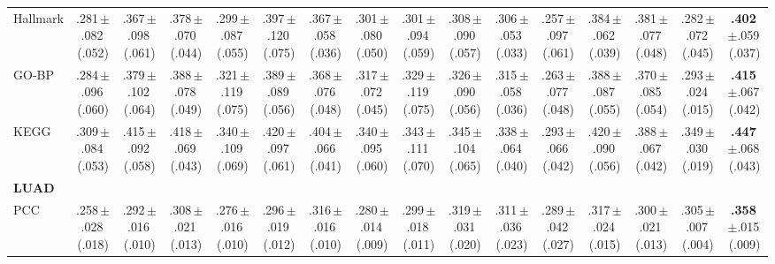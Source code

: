 \begin{table}
\begin{tabular}{lccccccccccccccc}
\quad Hallmark & .281\,{\tiny$\pm$.082}\,{\tiny(.052)} & .367\,{\tiny$\pm$.098}\,{\tiny(.061)} & .378\,{\tiny$\pm$.070}\,{\tiny(.044)} & .299\,{\tiny$\pm$.087}\,{\tiny(.055)} & .397\,{\tiny$\pm$.120}\,{\tiny(.075)} & .367\,{\tiny$\pm$.058}\,{\tiny(.036)} & .301\,{\tiny$\pm$.080}\,{\tiny(.050)} & .301\,{\tiny$\pm$.094}\,{\tiny(.059)} & .308\,{\tiny$\pm$.090}\,{\tiny(.057)} & .306\,{\tiny$\pm$.053}\,{\tiny(.033)} & .257\,{\tiny$\pm$.097}\,{\tiny(.061)} & .384\,{\tiny$\pm$.062}\,{\tiny(.039)} & .381\,{\tiny$\pm$.077}\,{\tiny(.048)} & .282\,{\tiny$\pm$.072}\,{\tiny(.045)} & \textbf{.402}\,{\tiny$\pm$.059}\,{\tiny(.037)}\\
\quad GO-BP & .284\,{\tiny$\pm$.096}\,{\tiny(.060)} & .379\,{\tiny$\pm$.102}\,{\tiny(.064)} & .388\,{\tiny$\pm$.078}\,{\tiny(.049)} & .321\,{\tiny$\pm$.119}\,{\tiny(.075)} & .389\,{\tiny$\pm$.089}\,{\tiny(.056)} & .368\,{\tiny$\pm$.076}\,{\tiny(.048)} & .317\,{\tiny$\pm$.072}\,{\tiny(.045)} & .329\,{\tiny$\pm$.119}\,{\tiny(.075)} & .326\,{\tiny$\pm$.090}\,{\tiny(.056)} & .315\,{\tiny$\pm$.058}\,{\tiny(.036)} & .263\,{\tiny$\pm$.077}\,{\tiny(.048)} & .388\,{\tiny$\pm$.087}\,{\tiny(.055)} & .370\,{\tiny$\pm$.085}\,{\tiny(.054)} & .293\,{\tiny$\pm$.024}\,{\tiny(.015)} & \textbf{.415}\,{\tiny$\pm$.067}\,{\tiny(.042)}\\
\quad KEGG & .309\,{\tiny$\pm$.084}\,{\tiny(.053)} & .415\,{\tiny$\pm$.092}\,{\tiny(.058)} & .418\,{\tiny$\pm$.069}\,{\tiny(.043)} & .340\,{\tiny$\pm$.109}\,{\tiny(.069)} & .420\,{\tiny$\pm$.097}\,{\tiny(.061)} & .404\,{\tiny$\pm$.066}\,{\tiny(.041)} & .340\,{\tiny$\pm$.095}\,{\tiny(.060)} & .343\,{\tiny$\pm$.111}\,{\tiny(.070)} & .345\,{\tiny$\pm$.104}\,{\tiny(.065)} & .338\,{\tiny$\pm$.064}\,{\tiny(.040)} & .293\,{\tiny$\pm$.066}\,{\tiny(.042)} & .420\,{\tiny$\pm$.090}\,{\tiny(.056)} & .388\,{\tiny$\pm$.067}\,{\tiny(.042)} & .349\,{\tiny$\pm$.030}\,{\tiny(.019)} & \textbf{.447}\,{\tiny$\pm$.068}\,{\tiny(.043)}\\
\midrule
\multicolumn{16}{l}{\textbf{LUAD}}\\
\quad PCC & .258\,{\tiny$\pm$.028}\,{\tiny(.018)} & .292\,{\tiny$\pm$.016}\,{\tiny(.010)} & .308\,{\tiny$\pm$.021}\,{\tiny(.013)} & .276\,{\tiny$\pm$.016}\,{\tiny(.010)} & .296\,{\tiny$\pm$.019}\,{\tiny(.012)} & .316\,{\tiny$\pm$.016}\,{\tiny(.010)} & .280\,{\tiny$\pm$.014}\,{\tiny(.009)} & .299\,{\tiny$\pm$.018}\,{\tiny(.011)} & .319\,{\tiny$\pm$.031}\,{\tiny(.020)} & .311\,{\tiny$\pm$.036}\,{\tiny(.023)} & .289\,{\tiny$\pm$.042}\,{\tiny(.027)} & .317\,{\tiny$\pm$.024}\,{\tiny(.015)} & .300\,{\tiny$\pm$.021}\,{\tiny(.013)} & .305\,{\tiny$\pm$.007}\,{\tiny(.004)} & \textbf{.358}\,{\tiny$\pm$.015}\,{\tiny(.009)}\\

\end{tabular}
\end{table}
